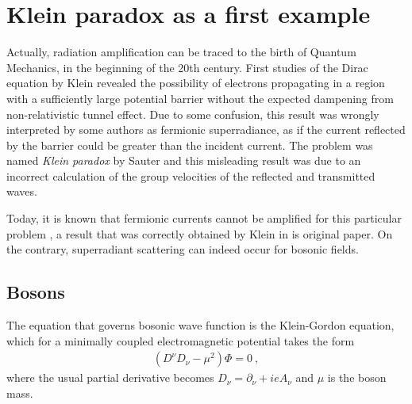 \section{Klein paradox as a first example}

Actually, radiation amplification can be traced to the birth of Quantum Mechanics, in the beginning of the 20th century. 
First studies of the Dirac equation by Klein \cite{Klein1929} revealed the possibility of electrons propagating in a region with a sufficiently large potential barrier without the expected dampening from non-relativistic tunnel effect.
Due to some confusion, this result was wrongly interpreted by some authors as fermionic superradiance, as if the current reflected by the barrier could be greater than the incident current. 
The problem was named \emph{Klein paradox} by Sauter \cite{Sauter1931} and this misleading result was due to an incorrect calculation of the group velocities of the reflected and transmitted waves. 

Today, it is known that fermionic currents cannot be amplified for this particular problem \cite{Manogue1988,Klein1929}, a result that was correctly obtained by Klein in is original paper. 
On the contrary, superradiant scattering can indeed occur for bosonic fields.

\subsection{Bosons}

The equation that governs bosonic wave function is the Klein-Gordon equation, which for a minimally coupled electromagnetic potential takes the form
\begin{align}
    (D^\nu D_\nu - \mu^2) \Phi = 0 ~,
    \label{eq1:KleinGordon}
\end{align}
where the usual partial derivative becomes $D_\nu = \partial_\nu + i e A_\nu$ and $\mu$ is the boson mass.

